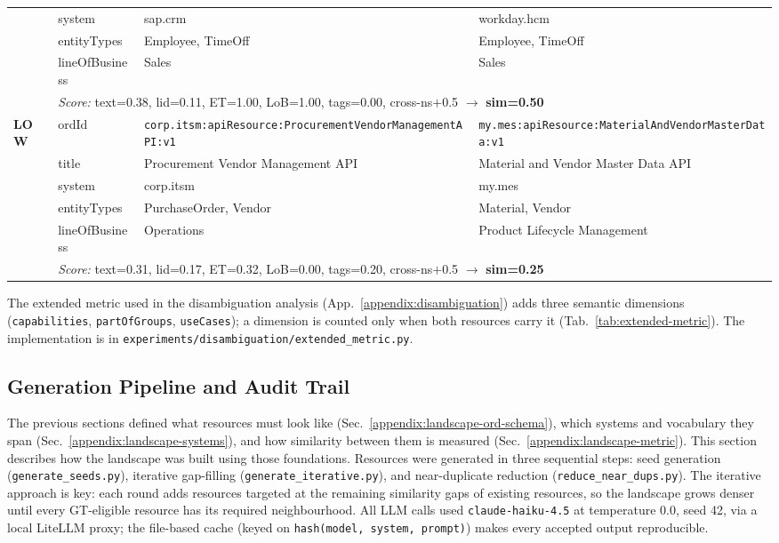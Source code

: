 \begin{table}[!t]
\begin{tabularx}{\textwidth}{@{} l l X X @{}}
  & system         & sap.crm & workday.hcm \\
  & entityTypes    & Employee, TimeOff & Employee, TimeOff \\
  & lineOfBusiness & Sales & Sales \\
  & \multicolumn{3}{l}{\emph{Score:} text=0.38, lid=0.11, ET=1.00, LoB=1.00, tags=0.00, cross-ns$+$0.5 $\rightarrow$ \textbf{sim=0.50}} \\
  \midrule
  \multirow{6}{*}{\textbf{LOW}}
  & ordId          & \texttt{corp.itsm:\allowbreak apiResource:\allowbreak ProcurementVendorManagementAPI:\allowbreak v1} & \texttt{my.mes:\allowbreak apiResource:\allowbreak MaterialAndVendorMasterData:\allowbreak v1} \\
  & title          & Procurement Vendor Management API & Material and Vendor Master Data API \\
  & system         & corp.itsm & my.mes \\
  & entityTypes    & PurchaseOrder, Vendor & Material, Vendor \\
  & lineOfBusiness & Operations & Product Lifecycle Management \\
  & \multicolumn{3}{l}{\emph{Score:} text=0.31, lid=0.17, ET=0.32, LoB=0.00, tags=0.20, cross-ns$+$0.5 $\rightarrow$ \textbf{sim=0.25}} \\
  \bottomrule
  \end{tabularx}
\end{table}

The extended metric used in the disambiguation analysis (App.~\ref{appendix:disambiguation}) adds three semantic dimensions (\texttt{capabilities}, \texttt{partOfGroups}, \texttt{useCases}); a dimension is counted only when both resources carry it (Tab.~\ref{tab:extended-metric}). The implementation is in \texttt{experiments/disambiguation/extended\_metric.py}.


\subsection{Generation Pipeline and Audit Trail}
\label{appendix:landscape-audit}

The previous sections defined what resources must look like (Sec.~\ref{appendix:landscape-ord-schema}), which systems and vocabulary they span (Sec.~\ref{appendix:landscape-systems}), and how similarity between them is measured (Sec.~\ref{appendix:landscape-metric}). This section describes how the landscape was built using those foundations. Resources were generated in three sequential steps: seed generation (\texttt{generate\_seeds.py}), iterative gap-filling (\texttt{generate\_iterative.py}), and near-duplicate reduction (\texttt{reduce\_near\_dups.py}). The iterative approach is key: each round adds resources targeted at the remaining similarity gaps of existing resources, so the landscape grows denser until every GT-eligible resource has its required neighbourhood. All LLM calls used \texttt{claude-haiku-4.5} at temperature 0.0, seed 42, via a local LiteLLM proxy; the file-based cache (keyed on \texttt{hash(model, system, prompt)}) makes every accepted output reproducible.

